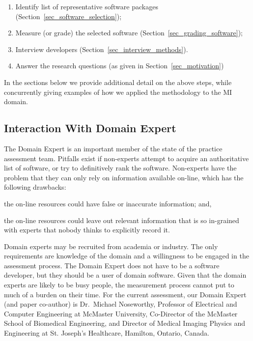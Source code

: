 \documentclass[3p, 12pt,authoryear]{elsarticle}
\begin{document}
\begin{enumerate}
\item Identify list of representative software packages
(Section~\ref{sec_software_selection});
\item Measure (or grade) the selected software (Section~\ref{sec_grading_software});
\item Interview developers (Section~\ref{sec_interview_methods}).
\item Answer the research questions (as given in Section~\ref{sec_motivation})
\end{enumerate}

In the sections below we provide additional detail on the above steps, while
concurrently giving examples of how we applied the methodology to the MI domain.

\subsection{Interaction With Domain Expert} \label{sec_vet_software_list}

The Domain Expert is an important member of the state of the practice assessment
team. Pitfalls exist if non-experts attempt to acquire an authoritative list of
software, or try to definitively rank the software. Non-experts have the problem
that they can only rely on information available on-line, which has the
following drawbacks:
\begin{inparaenum}[i)]
  \item the on-line resources could have false or inaccurate information; and,
  \item the on-line resources could leave out relevant information that is so
in-grained with experts that nobody thinks to explicitly record it.
\end{inparaenum}

Domain experts may be recruited from academia or industry.  The only
requirements are knowledge of the domain and a willingness to be engaged in the
assessment process.  The Domain Expert does not have to be a software developer,
but they should be a user of domain software.  Given that the domain experts are
likely to be busy people, the measurement process cannot put to much of a burden
on their time.  For the current assessment, our Domain Expert (and paper
co-author) is Dr.\ Michael Noseworthy, Professor of Electrical and Computer
Engineering at McMaster University, Co-Director of the McMaster School of
Biomedical Engineering, and Director of Medical Imaging Physics and Engineering
at St. Joseph’s Healthcare, Hamilton, Ontario, Canada.  
\end{document}
